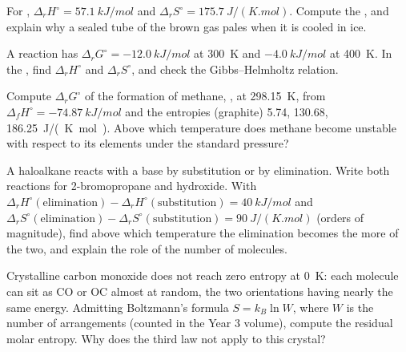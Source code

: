 \begin{exercise}[$\star\star$]\label{exo:b2:reaction-free-energy:6}
For , $\Delta_r H^\circ = \qty{57.1}{kJ/mol}$ and
$\Delta_r S^\circ = \qty{175.7}{J/(K.mol)}$. Compute the , and explain why a sealed tube of the brown gas  pales
when it is cooled in ice.
\end{exercise}

\begin{exercise}[$\star\star$]\label{exo:b2:reaction-free-energy:7}
A reaction has $\Delta_r G^\circ = \qty{-12.0}{kJ/mol}$ at \qty{300}{K}
and $\qty{-4.0}{kJ/mol}$ at \qty{400}{K}. In the ,
find $\Delta_r H^\circ$ and $\Delta_r S^\circ$, and check the
Gibbs--Helmholtz relation.
\end{exercise}

\begin{exercise}[$\star\star$]\label{exo:b2:reaction-free-energy:8}
Compute $\Delta_r G^\circ$ of the formation of methane, , at \qty{298.15}{K}, from $\Delta_f H^\circ = \qty{-74.87}{kJ/mol}$
and the entropies  (graphite) 5.74,  130.68, 
\qty{186.25}{J/(K.mol)}. Above which temperature does methane become
unstable with respect to its elements under the standard pressure?
\end{exercise}

\begin{exercise}[$\star\star$]\label{exo:b2:reaction-free-energy:9}
A haloalkane reacts with a base by substitution or by elimination. Write
both reactions for 2-bromopropane and hydroxide. With $\Delta_r
H^\circ(\text{elimination}) - \Delta_r H^\circ(\text{substitution}) =
\qty{+40}{kJ/mol}$ and $\Delta_r S^\circ(\text{elimination}) - \Delta_r
S^\circ(\text{substitution}) = \qty{+90}{J/(K.mol)}$ (orders of magnitude),
find above which temperature the elimination becomes the more  of
the two, and explain the role of the number of molecules.
\end{exercise}

\begin{exercise}[$\star\star\star$]\label{exo:b2:reaction-free-energy:10}
Crystalline carbon monoxide does not reach zero entropy at \qty{0}{K}: each
molecule can sit as CO or OC almost at random, the two orientations having
nearly the same energy. Admitting Boltzmann's formula $S = k_B\ln W$, where
$W$ is the number of arrangements (counted in the Year 3 volume), compute
the residual molar entropy. Why does the third law not apply to this
crystal?
\end{exercise}

